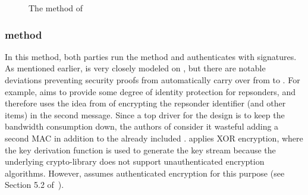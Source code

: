 \begin{figure}[!h]
{}
\caption{The \mStatSig{} method of \mEdhoc}
\label{fig:edhocstatsig}
\end{figure}

\subsubsection{\mSigSig{} method}
In this method, both parties run the \mSig{} method and authenticates with
signatures.
%
As mentioned earlier, \mSigSig{} is very closely modeled on \mSigmaI{}, but
there are notable deviations preventing security proofs from automatically
carry over from \mSigmaI{} to \mEdhoc{}.
%
For example, \mEdhoc{} aims to provide some degree of identity protection
for repsonders, and therefore uses the idea from \mSigmaI{} of encrypting
the repsonder identifier \mIdcredr{} (and other items) in the second message.
%
Since a top driver for the \mEdhoc{} design is to keep the bandwidth consumption
down, the authors of \mEdhoc{} consider it wasteful adding a second MAC
in addition to the already included \mMactwo{}.
%
\mEdhoc{} applies XOR encryption, where the key derivation function
\mHkdf{} is used to generate the key stream because the underlying
crypto-library \mCose{} does not support unauthenticated encryption algorithms.
%
However, \mSigma{} assumes authenticated encryption for this purpose (see
Section 5.2 of~\cite{sigma}).
%


